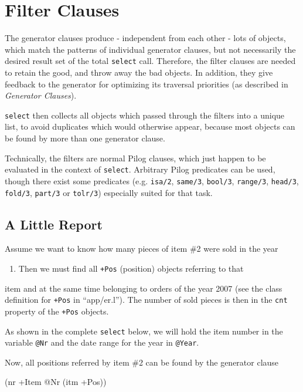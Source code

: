  
\section{Filter Clauses}
\label{sec:select-pred-filter-clauses}


The generator clauses produce - independent from each other - lots of
objects, which match the patterns of individual generator clauses, but
not necessarily the desired result set of the total \texttt{select} call.
Therefore, the filter clauses are needed to retain the good, and throw
away the bad objects. In addition, they give feedback to the generator
for optimizing its traversal priorities (as described in
\emph{Generator Clauses}).

\texttt{select} then collects all objects which passed through the filters into
a unique list, to avoid duplicates which would otherwise appear, because
most objects can be found by more than one generator clause.

Technically, the filters are normal Pilog clauses, which just happen to
be evaluated in the context of \texttt{select}. Arbitrary Pilog predicates can
be used, though there exist some predicates (e.g. \texttt{isa/2}, \texttt{same/3},
\texttt{bool/3}, \texttt{range/3}, \texttt{head/3}, \texttt{fold/3}, \texttt{part/3} or \texttt{tolr/3})
especially suited for that task.

 
\subsection{A Little Report}
\label{sec:select-pred-a-little-report}


Assume we want to know how many pieces of item \#2 were sold in the year
\begin{enumerate}
\item Then we must find all \texttt{+Pos} (position) objects referring to that
\end{enumerate}
item and at the same time belonging to orders of the year 2007 (see the
class definition for \texttt{+Pos} in ``app/er.l''). The number of sold pieces is
then in the \texttt{cnt} property of the \texttt{+Pos} objects.

As shown in the complete \texttt{select} below, we will hold the item number in
the variable \texttt{@Nr} and the date range for the year in \texttt{@Year}.

Now, all positions referred by item \#2 can be found by the generator
clause


\begin{wideverbatim}
(nr +Item @Nr (itm +Pos))
\end{wideverbatim}

